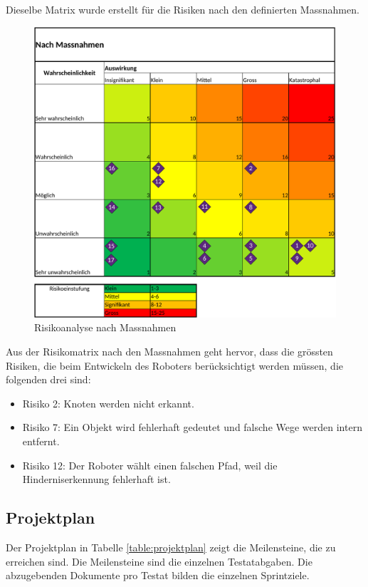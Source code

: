 Dieselbe Matrix wurde erstellt für die Risiken nach den definierten Massnahmen.

\begin{figure}[H]
\centering
\includegraphics[width=\textwidth -40mm]{assets/Risikoanalyse_nach_Massnahmen.pdf}
\caption{Risikoanalyse nach Massnahmen}
\label{fig:risk-after}
\end{figure}

Aus der Risikomatrix nach den Massnahmen geht hervor, dass die grössten Risiken, die beim Entwickeln des Roboters berücksichtigt werden müssen, die folgenden drei sind:

\begin{itemize}
    \item Risiko 2: Knoten werden nicht erkannt.
    \item Risiko 7: Ein Objekt wird fehlerhaft gedeutet und falsche Wege werden intern entfernt.
    \item Risiko 12: Der Roboter wählt einen falschen Pfad, weil die Hinderniserkennung fehlerhaft ist.
\end{itemize}


\newpage
\subsection{Projektplan}

Der Projektplan in Tabelle \ref{table:projektplan} zeigt die Meilensteine, die zu erreichen sind.
Die Meilensteine sind die einzelnen Testatabgaben.
Die abzugebenden Dokumente pro Testat bilden die einzelnen Sprintziele.

